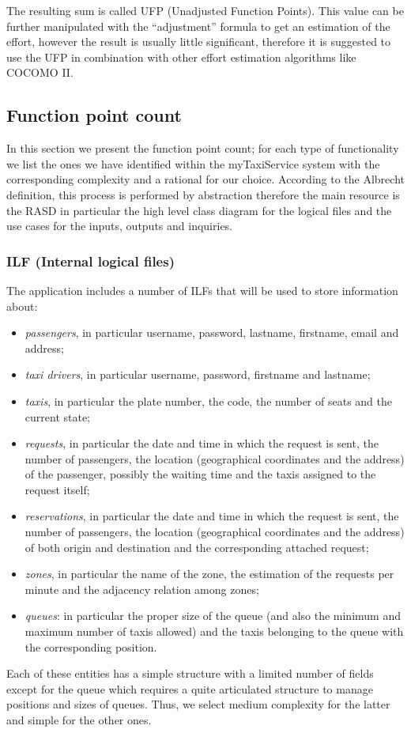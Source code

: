\bigskip{}


The resulting sum is called UFP (Unadjusted Function Points). This
value can be further manipulated with the ``adjustment'' formula
to get an estimation of the effort, however the result is usually
little significant, therefore it is suggested to use the UFP in combination
with other effort estimation algorithms like COCOMO II. 


\subsection{Function point count}

In this section we present the function point count; for each type
of functionality we list the ones we have identified within the myTaxiService
system with the corresponding complexity and a rational for our choice.
According to the Albrecht definition, this process is performed by
abstraction therefore the main resource is the RASD in particular
the high level class diagram for the logical files and the use cases
for the inputs, outputs and inquiries.


\subsubsection{ILF (Internal logical files)}

The application includes a number of ILFs that will be used to store
information about:
\begin{itemize}
\item \emph{passengers}, in particular username, password, lastname, firstname,
email and address;
\item \emph{taxi drivers}, in particular username, password, firstname and
lastname;
\item \emph{taxis}, in particular the plate number, the code, the number
of seats and the current state;
\item \emph{requests}, in particular the date and time in which the request
is sent, the number of passengers, the location (geographical coordinates
and the address) of the passenger, possibly the waiting time and the
taxis assigned to the request itself;
\item \emph{reservations}, in particular the date and time in which the
request is sent, the number of passengers, the location (geographical
coordinates and the address) of both origin and destination and the
corresponding attached request;
\item \emph{zones}, in particular the name of the zone, the estimation of
the requests per minute and the adjacency relation among zones;
\item \emph{queues}: in particular the proper size of the queue (and also
the minimum and maximum number of taxis allowed) and the taxis belonging
to the queue with the corresponding position.
\end{itemize}
Each of these entities has a simple structure with a limited number
of fields except for the queue which requires a quite articulated
structure to manage positions and sizes of queues. Thus, we select
medium complexity for the latter and simple for the other ones. 

